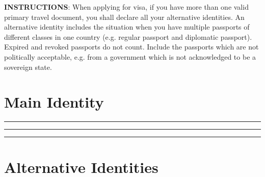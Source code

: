 




\begin{minipage}{\textwidth}
	\small
	\textbf{INSTRUCTIONS}:
	\inlinelistitem When applying for visa, if you have more than one valid primary travel document, you shall declare all your alternative identities.
	\inlinelistitem An alternative identity includes the situation when you have multiple passports of different classes in one country (e.g. regular passport and diplomatic passport).
	\inlinelistitem Expired and revoked passports do not count.
	\inlinelistitem Include the passports which are not politically acceptable, e.g. from a government which is not acknowledged to be a sovereign state.
\end{minipage}


\section*{Main Identity}

\par\hrule
\formbrickVlineLeft%
%
\formbrickVlineRight%
\par\hrule
\formbrickVlineLeft%
\formbrickVlineMid%
%
\formbrickVlineRight%
\par\hrule

\section*{Alternative Identities}

\newcommand{\localformboxA}[0]{
	\formbrickVlineLeft%
	\makesoftformbrick{70pt}{Country Code}{\vspace{20pt}}\formbrickVlineMid%
	\makesoftformbrick{100pt}{Passport No.}{\vspace{20pt}}\formbrickVlineMid%
	\makesoftformbrick{\linewidth-200pt}{Class (fill black)}{\rmfamily $\bigcirc$ Regular / $\bigcirc$ Diplomatic / $\bigcirc$ Official / $\bigcirc$ Service}%
	\formbrickVlineRight%
	\par\hrule
}

